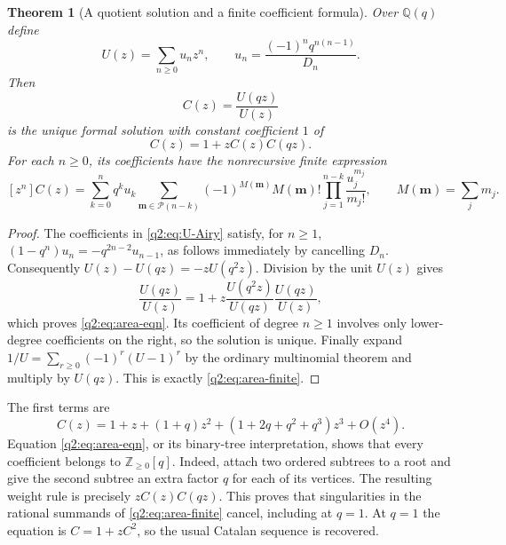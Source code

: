 \documentclass[11pt,a4paper,oneside,openany]{book}
\newtheorem{theorem}{Theorem}[chapter]
\theoremstyle{definition}
\theoremstyle{remark}
\newcommand{\Z}{\mathbb Z}
\newcommand{\Q}{\mathbb Q}
\newcommand{\Pcal}{\mathcal P}
\begin{document}
\begin{theorem}[A quotient solution and a finite coefficient formula]\label{q2:thm:qcat}
Over $\Q(q)$ define
\begin{equation}\label{q2:eq:U-Airy}
 U(z)=\sum_{n\ge0}u_nz^n,\qquad
 u_n=\frac{(-1)^nq^{n(n-1)}}{D_n}.
\end{equation}
Then
\begin{equation}\label{q2:eq:C-Airy}
 C(z)=\frac{U(qz)}{U(z)}
\end{equation}
is the unique formal solution with constant coefficient $1$ of
\begin{equation}\label{q2:eq:area-eqn}
 C(z)=1+zC(z)C(qz).
\end{equation}
For each $n\ge0$, its coefficients have the nonrecursive finite expression
\begin{equation}\label{q2:eq:area-finite}
 [z^n]C(z)=\sum_{k=0}^n q^k u_k
   \sum_{\bm m\in\Pcal(n-k)}
       (-1)^{M(\bm m)}M(\bm m)!
           \prod_{j=1}^{n-k}\frac{u_j^{m_j}}{m_j!},
 \qquad M(\bm m)=\sum_jm_j.
\end{equation}
\end{theorem}
\begin{proof}
The coefficients in \eqref{q2:eq:U-Airy} satisfy, for $n\ge1$,
$(1-q^n)u_n=-q^{2n-2}u_{n-1}$, as follows immediately by cancelling $D_n$.
Consequently $U(z)-U(qz)=-zU(q^2z)$. Division by the unit $U(z)$ gives
\[
 \frac{U(qz)}{U(z)}=1+z\frac{U(q^2z)}{U(qz)}\frac{U(qz)}{U(z)},
\]
which proves \eqref{q2:eq:area-eqn}. Its coefficient of degree $n\ge1$ involves
only lower-degree coefficients on the right, so the solution is unique.
Finally expand $1/U=\sum_{r\ge0}(-1)^r(U-1)^r$ by the ordinary multinomial
theorem and multiply by $U(qz)$. This is exactly \eqref{q2:eq:area-finite}.
\end{proof}

The first terms are
\begin{equation}\label{q2:eq:area-first}
 C(z)=1+z+(1+q)z^2+(1+2q+q^2+q^3)z^3+O(z^4).
\end{equation}
Equation \eqref{q2:eq:area-eqn}, or its binary-tree interpretation, shows that every
coefficient belongs to $\Z_{\ge0}[q]$. Indeed, attach two ordered subtrees to a root
and give the second subtree an extra factor $q$ for each of its vertices. The
resulting weight rule is precisely $zC(z)C(qz)$. This proves that singularities
in the rational summands of \eqref{q2:eq:area-finite} cancel, including at $q=1$.
At $q=1$ the equation is $C=1+zC^2$, so the usual Catalan sequence is recovered.
\end{document}
